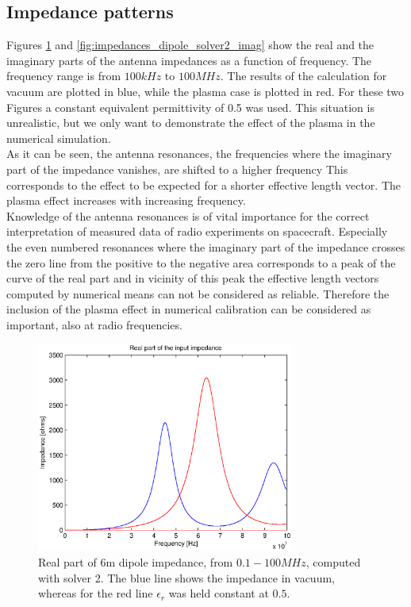 \documentclass[two-column,ras]{agutex}
\begin{document}
\begin{article}
\subsection{Impedance patterns}
Figures \ref{fig:impedances_dipole_solver2_real} and \ref{fig:impedances_dipole_solver2_imag} show the real and the imaginary parts of the antenna impedances as a function of frequency. The frequency range is from $100kHz$ to $100MHz$. The results of the calculation for vacuum are plotted in blue, while the plasma case is plotted in red. For these two Figures a constant equivalent permittivity of 0.5 was used. This situation is unrealistic, but we only want to demonstrate the effect of the plasma in the numerical simulation.\\

As it can be seen, the antenna resonances, the frequencies where the imaginary part of the impedance vanishes, are shifted to a higher frequency This corresponds to the effect to be expected for a shorter effective length vector. The plasma effect increases with increasing frequency.\\

Knowledge of the antenna resonances is of vital importance for the correct interpretation of measured data of radio experiments on spacecraft. Especially the even numbered resonances where the imaginary part of the impedance crosses the zero line from the positive to the negative area corresponds to a peak of the curve of the real part and in vicinity of this peak the effective length vectors computed by numerical means can not be considered as reliable. Therefore the inclusion of the plasma effect in numerical calibration can be considered as important, also at radio frequencies.\\


\begin{figure}
  \noindent\includegraphics[width=20pc]{imps_dipole_solver2_real.eps}
\caption{Real part of 6m dipole impedance, from $0.1 - 100 MHz$, computed with solver 2. The blue line shows the impedance in vacuum, whereas for the red line $\epsilon_r$ was held constant at $0.5$.}
\label{fig:impedances_dipole_solver2_real}
\end{figure}


\end{article}
\end{document}
